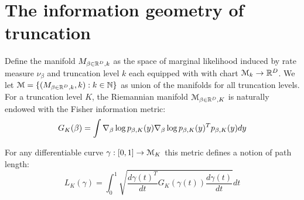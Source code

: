 \documentclass[letterpaper]{article}
\begin{document}
	\section{The information geometry of truncation}
	
	Define the manifold $M_{\beta\in\mathbb{R}^D,k}$ as the space of  marginal likelihood induced by rate measure $\nu_\beta$ and truncation level $k$ each equipped with with chart $\mathcal{M}_k\rightarrow\mathbb{R}^D$. We let $\mathcal{M}=\{(M_{\beta\in\mathbb{R}^D,k},k):k\in\mathbb{N}\}$ as union of the manifolds for all truncation levels. For a truncation level $K$, the Riemannian manifold $\mathcal{M}_{\beta\in\mathbb{R}^D,K}$ is naturally endowed with the Fisher information metric:
	\[
	G_K(\beta)=\int\nabla_\beta\log p_{\beta,K}(y)\nabla_\beta\log p_{\beta,K}(y)^Tp_{\beta,K}(y)dy
	\]
	
	For any differentiable curve $\gamma:[0,1]\rightarrow\mathcal{M}_K$ this metric defines a notion of path length:
	\[
	L_K(\gamma)=\int_0^1\sqrt{\frac{d\gamma(t)^T}{dt}G_K(\gamma(t))\frac{d\gamma(t)}{dt}}dt
	\]
	
	
	
	{
		\small
		
		
	}
	
\end{document}
